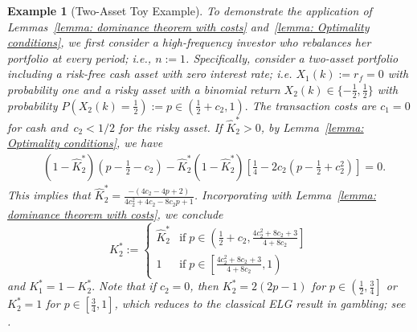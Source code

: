 \documentclass[10pt]{article} %
\newtheorem{example}{Example}[section]
\begin{document}
	
	\begin{example}[Two-Asset Toy Example] \label{example: two asset toy example} \rm  
		To demonstrate the application of Lemmas~\ref{lemma: dominance theorem with costs} and~\ref{lemma: Optimality conditions}, we first consider a high-frequency investor who rebalances her portfolio at every period; i.e., $n:=1$. 
		Specifically,  consider a two-asset portfolio including a risk-free cash asset with zero interest rate; i.e. $X_1(k) := r_f = 0$ with probability one and a risky asset with a binomial return $X_2(k) \in  \{ -\frac{1}{2}, \frac{1}{2} \}$ with probability 
		$
		P\left( X_2(k) =\frac{1}{2} \right) := p \in \left( \frac{1}{2} + c_2, 1 \right).
		$
		The transaction costs are $c_1 = 0$ for cash and~$c_2 < 1/2$ for the risky asset. 
		If $\widehat{K}_2^* > 0$, by Lemma~\ref{lemma: Optimality conditions}, we have
		\begin{align*}
			& (1-\widehat{K}_2^*)\left( p-\frac{1}{2}-c_2 \right)  - \widehat{K}_2^* (1 - \widehat{K}_2^*) \left[\frac{1}{4}-2c_2 \left( p-\frac{1}{2} + c_2^2 \right) \right] = 0.
		\end{align*}
		This implies that $\widehat{K}_2^* = \frac{-(4c_2-4p+2)}{4c_2^2+4c_2-8c_2p+1}$.
		Incorporating with Lemma~\ref{lemma: dominance theorem with costs}, we conclude
		\begin{equation}
			K_2^* := 
			\begin{cases}
				\widehat{K}_2^*  & \text{if} \; p\in \left(\frac{1}{2}+c_2,\frac{4c_2^2+8c_2+3}{4+8c_2}\right] \\
				1 & \text{if} \; p\in \left[\frac{4c_2^2+8c_2+3}{4+8c_2}, 1\right)
			\end{cases}
		\end{equation}
		and $K_1^*= 1-K_2^*.$
		Note that if $c_2 = 0$, then $K_2^* = 2(2p-1)$ for $p \in \left(\frac{1}{2},  \frac{3}{4}\right]$ or $K_2^* = 1$ for $p \in \left[\frac{3}{4}, 1\right]$, which reduces to the classical ELG result in gambling; see \cite{Kelly_1956, hsieh2018frequency}.
		

\end{example}
\end{document}
